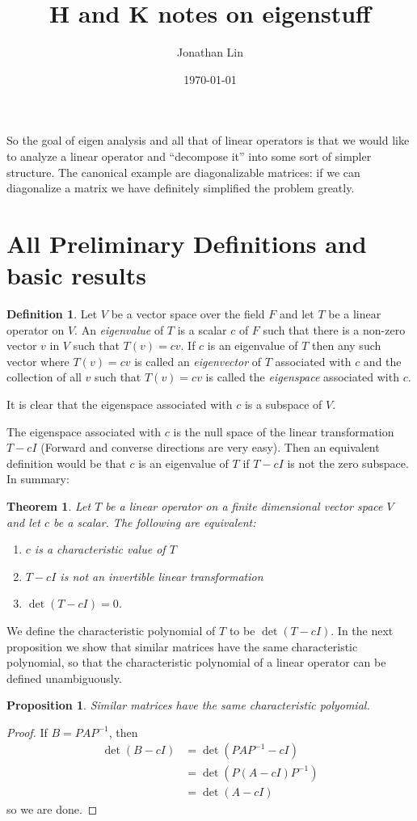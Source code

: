 \documentclass[12pt]{article}
\title{H and K notes on eigenstuff}
\author{Jonathan Lin}
\date{\today}
\theoremstyle{plain}
\newtheorem{thm}{Theorem}
\newtheorem{prop}{Proposition}
\theoremstyle{definition}
\newtheorem{def}{Definition}
\begin{document}
\maketitle

So the goal of eigen analysis and all that of linear operators is that we would like to analyze a linear operator and ``decompose it'' into some sort of simpler structure. The canonical example are diagonalizable matrices: if we can diagonalize a matrix we have definitely simplified the problem greatly.
\section{All Preliminary Definitions and basic results}

\begin{def}
Let $V$ be a vector space over the field $F$ and let $T$ be a linear operator on $V$. An \textit{eigenvalue} of $T$ is a scalar $c$ of $F$ such that there is a non-zero vector $v$ in $V$ such that $T(v) = cv$. If $c$ is an eigenvalue of $T$ then any such vector where $T(v) = cv$ is called an \textit{eigenvector} of $T$ associated with $c$ and the collection of all $v$ such that $T(v) = cv$ is called the \textit{eigenspace} associated with $c$.
\end{def}

It is clear that the eigenspace associated with $c$ is a subspace of $V$.

The eigenspace associated with $c$ is the null space of the linear transformation $T - cI$ (Forward and converse directions are very easy). Then an equivalent definition would be that $c$ is an eigenvalue of $T$ if $T - cI$ is not the zero subspace. In summary:

\begin{thm}
Let $T$ be a linear operator on a finite dimensional vector space $V$ and let $c$ be a scalar. The following are equivalent:
\begin{enumerate}
	\item $c$ is a characteristic value of $T$
	\item $T - cI$ is not an invertible linear transformation
	\item $\det(T - cI) = 0$.
\end{enumerate}
\end{thm}

We define the characteristic polynomial of $T$ to be $\det(T - cI)$. In the next proposition we show that similar matrices have the same characteristic polynomial, so that the characteristic polynomial of a linear operator can be defined unambiguously.
\begin{prop}
	Similar matrices have the same characteristic polyomial.
\end{prop}
\begin{proof}
	If $B = PAP^{-1}$, then
	\begin{align*}
		\det(B - cI) &= \det(PAP^{-1} - cI) \\
						&= \det(P(A - cI)P^{-1}) \\
						&= \det(A - cI)
	\end{align*}
	so we are done.
\end{proof}
\end{document}
